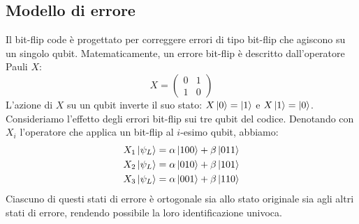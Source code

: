 \documentclass[a4paper,12pt]{report}
\theoremstyle{plain}
\begin{document}
\subsection{Modello di errore}
Il bit-flip code è progettato per correggere errori di tipo bit-flip che agiscono su un singolo qubit. Matematicamente, un errore bit-flip è descritto dall'operatore Pauli $X$:
\[
X = \begin{pmatrix} 0 & 1 \\ 1 & 0 \end{pmatrix}
\]
L'azione di $X$ su un qubit inverte il suo stato: $X\ket{0} = \ket{1}$ e $X\ket{1} = \ket{0}$.
Consideriamo l'effetto degli errori bit-flip sui tre qubit del codice. Denotando con $X_i$ l'operatore che applica un bit-flip al $i$-esimo qubit, abbiamo:
\begin{align}
X_1\ket{\psi_L} &= \alpha\ket{100} + \beta\ket{011} \\
X_2\ket{\psi_L} &= \alpha\ket{010} + \beta\ket{101} \\
X_3\ket{\psi_L} &= \alpha\ket{001} + \beta\ket{110}
\end{align}
Ciascuno di questi stati di errore è ortogonale sia allo stato originale sia agli altri stati di errore, rendendo possibile la loro identificazione univoca.
\end{document}
